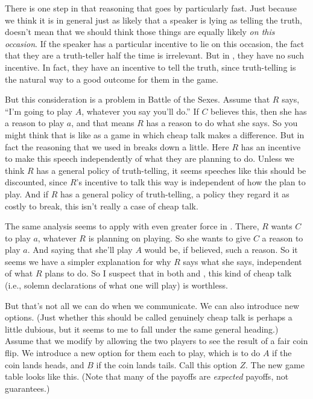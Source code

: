 There is one step in that reasoning that goes by particularly fast. Just because we think it is in general just as likely that a speaker is lying as telling the truth, doesn't mean that we should think those things are equally likely \textit{on this occasion}. If the speaker has a particular incentive to lie on this occasion, the fact that they are a truth-teller half the time is irrelevant. But in , they have no such incentive. In fact, they have an incentive to tell the truth, since truth-telling is the natural way to a good outcome for them in the game.

But this consideration is a problem in Battle of the Sexes. Assume that $R$ says, ``I'm going to play $A$, whatever you say you'll do.'' If $C$ believes this, then she has a reason to play $a$, and that means $R$ has a reason to do what she says. So you might think that  is like  as a game in which cheap talk makes a difference. But in fact the reasoning that we used in  breaks down a little. Here $R$ has an incentive to make this speech independently of what they are planning to do. Unless we think $R$ has a general policy of truth-telling, it seems speeches like this should be discounted, since $R$'s incentive to talk this way is independent of how the plan to play. And if $R$ has a general policy of truth-telling, a policy they regard it as costly to break, this isn't really a case of cheap talk.

The same analysis seems to apply with even greater force in . There, $R$ wants $C$ to play $a$, whatever $R$ is planning on playing. So she wants to give $C$ a reason to play $a$. And saying that she'll play $A$ would be, if believed, such a reason. So it seems we have a simpler explanation for why $R$ says what she says, independent of what $R$ plans to do. So I suspect that in both  and , this kind of cheap talk (i.e., solemn declarations of what one will play) is worthless.

But that's not all we can do when we communicate. We can also introduce new options. (Just whether this should be called genuinely cheap talk is perhaps a little dubious, but it seems to me to fall under the same general heading.) Assume that we modify  by allowing the two players to see the result of a fair coin flip. We introduce a new option for them each to play, which is to do $A$ if the coin lands heads, and $B$ if the coin lands tails. Call this option $Z$. The new game table looks like this. (Note that many of the payoffs are \textit{expected} payoffs, not guarantees.)

